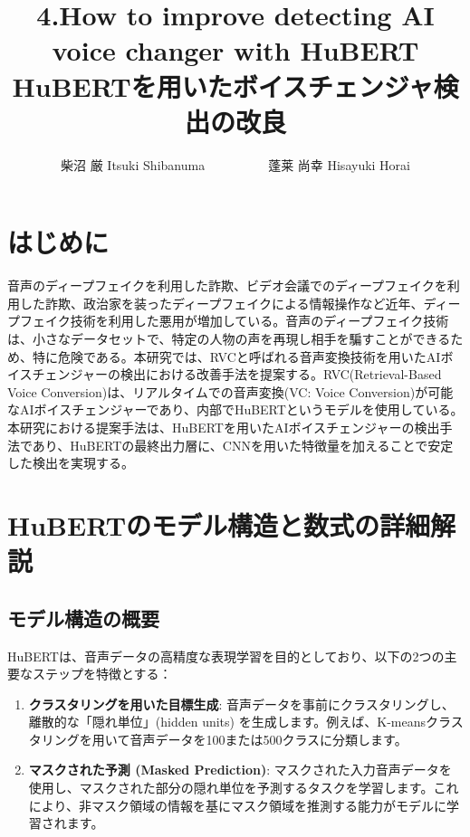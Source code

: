 \documentclass[10pt]{ltjsarticle}
\begin{document}
\title{4.How to improve detecting AI voice changer with HuBERT 
\\HuBERTを用いたボイスチェンジャ検出の改良}
\author{柴沼 厳 Itsuki Shibanuma　　　　　蓬莱 尚幸 Hisayuki Horai}

\maketitle

\section{はじめに}

音声のディープフェイクを利用した詐欺、ビデオ会議でのディープフェイクを利用した詐欺、政治家を装ったディープフェイクによる情報操作など近年、ディープフェイク技術を利用した悪用が増加している。音声のディープフェイク技術は、小さなデータセットで、特定の人物の声を再現し相手を騙すことができるため、特に危険である。本研究では、RVCと呼ばれる音声変換技術を用いたAIボイスチェンジャーの検出における改善手法を提案する。RVC(Retrieval-Based Voice Conversion)は、リアルタイムでの音声変換(VC: Voice Conversion)が可能なAIボイスチェンジャーであり、内部でHuBERTというモデルを使用している。本研究における提案手法は、HuBERTを用いたAIボイスチェンジャーの検出手法であり、HuBERTの最終出力層に、CNNを用いた特徴量を加えることで安定した検出を実現する。

\section{HuBERTのモデル構造と数式の詳細解説}

\subsection{モデル構造の概要}
HuBERTは、音声データの高精度な表現学習を目的としており、以下の2つの主要なステップを特徴とする：
\begin{enumerate}
    \item \textbf{クラスタリングを用いた目標生成}:
    音声データを事前にクラスタリングし、離散的な「隠れ単位」(hidden units) を生成します。例えば、K-meansクラスタリングを用いて音声データを100または500クラスに分類します。
    \item \textbf{マスクされた予測 (Masked Prediction)}:
    マスクされた入力音声データを使用し、マスクされた部分の隠れ単位を予測するタスクを学習します。これにより、非マスク領域の情報を基にマスク領域を推測する能力がモデルに学習されます。
\end{enumerate}
\end{document}
